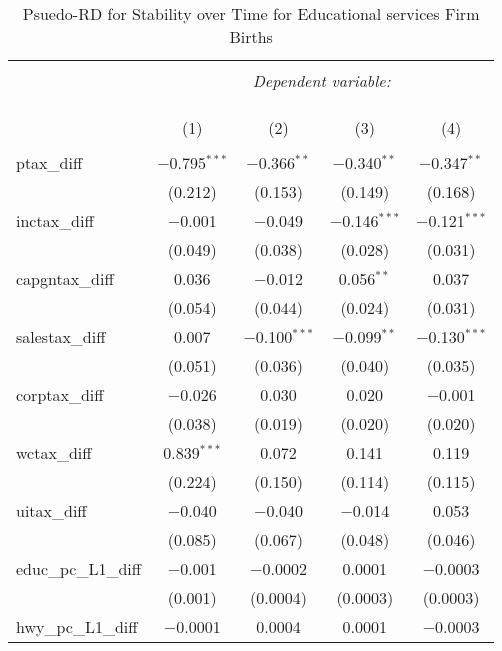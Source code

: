 
\begin{table}[!htbp] \centering 
  \caption{Psuedo-RD for Stability over Time for  Educational services Firm Births} 
  \label{} 
\begin{tabular}{@{\extracolsep{5pt}}lcccc} 
\\[-1.8ex]\hline 
\hline \\[-1.8ex] 
 & \multicolumn{4}{c}{\textit{Dependent variable:}} \\ 
\cline{2-5} 
\\[-1.8ex] & \multicolumn{4}{c}{ } \\ 
\\[-1.8ex] & (1) & (2) & (3) & (4)\\ 
\hline \\[-1.8ex] 
 ptax\_diff & $-$0.795$^{***}$ & $-$0.366$^{**}$ & $-$0.340$^{**}$ & $-$0.347$^{**}$ \\ 
  & (0.212) & (0.153) & (0.149) & (0.168) \\ 
  inctax\_diff & $-$0.001 & $-$0.049 & $-$0.146$^{***}$ & $-$0.121$^{***}$ \\ 
  & (0.049) & (0.038) & (0.028) & (0.031) \\ 
  capgntax\_diff & 0.036 & $-$0.012 & 0.056$^{**}$ & 0.037 \\ 
  & (0.054) & (0.044) & (0.024) & (0.031) \\ 
  salestax\_diff & 0.007 & $-$0.100$^{***}$ & $-$0.099$^{**}$ & $-$0.130$^{***}$ \\ 
  & (0.051) & (0.036) & (0.040) & (0.035) \\ 
  corptax\_diff & $-$0.026 & 0.030 & 0.020 & $-$0.001 \\ 
  & (0.038) & (0.019) & (0.020) & (0.020) \\ 
  wctax\_diff & 0.839$^{***}$ & 0.072 & 0.141 & 0.119 \\ 
  & (0.224) & (0.150) & (0.114) & (0.115) \\ 
  uitax\_diff & $-$0.040 & $-$0.040 & $-$0.014 & 0.053 \\ 
  & (0.085) & (0.067) & (0.048) & (0.046) \\ 
  educ\_pc\_L1\_diff & $-$0.001 & $-$0.0002 & 0.0001 & $-$0.0003 \\ 
  & (0.001) & (0.0004) & (0.0003) & (0.0003) \\ 
  hwy\_pc\_L1\_diff & $-$0.0001 & 0.0004 & 0.0001 & $-$0.0003 \\ 

\end{tabular}
\end{table}
